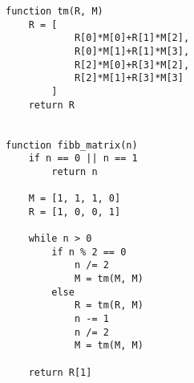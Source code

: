 \documentclass{article}[13pt]
\begin{document}
\begin{lstlisting}[language=juleczka]
function tm(R, M)
    R = [
            R[0]*M[0]+R[1]*M[2], 
            R[0]*M[1]+R[1]*M[3], 
            R[2]*M[0]+R[3]*M[2], 
            R[2]*M[1]+R[3]*M[3]
        ]
    return R


function fibb_matrix(n)
    if n == 0 || n == 1
        return n
    
    M = [1, 1, 1, 0]
    R = [1, 0, 0, 1]

    while n > 0
        if n % 2 == 0
            n /= 2
            M = tm(M, M)
        else
            R = tm(R, M)
            n -= 1
            n /= 2
            M = tm(M, M)
    
    return R[1]
\end{lstlisting}
\end{document}
